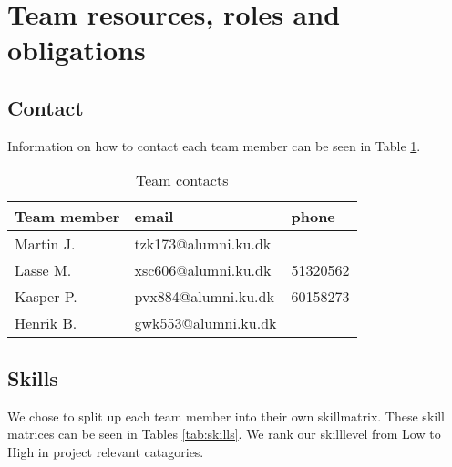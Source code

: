 \section{Team resources, roles and obligations}


\subsection{Contact}
Information on how to contact each team member can be seen in Table \ref{tab:contacts}.
\begin{table}[!ht]
    \centering
    \begin{tabular}{l|l|l}
        \rowcolor{Gray}
        \textbf{Team member} & \textbf{email} & \textbf{phone} \\\hline
        Martin J.            & tzk173@alumni.ku.dk & \\
        Lasse M.             & xsc606@alumni.ku.dk & 51320562 \\
        Kasper P.            & pvx884@alumni.ku.dk & 60158273 \\
        Henrik B.            & gwk553@alumni.ku.dk & 
    \end{tabular}
    \caption{Team contacts}
    \label{tab:contacts}
\end{table}

\subsection{Skills}
We chose to split up each team member into their own skillmatrix.
These skill matrices can be seen in Tables \ref{tab:skills}.
We rank our skilllevel from Low to High in project relevant catagories.


